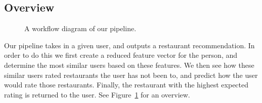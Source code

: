 \documentclass[10pt,twocolumn,letterpaper]{article}
\begin{document}
\subsection{Overview}
\begin{figure}[t]
\begin{center}
\end{center}
   \caption{A workflow diagram of our pipeline.}
\label{fig:workflow}
\end{figure}

Our pipeline takes in a given user, and outputs a restaurant recommendation. In order to do this we first create a reduced feature vector for the person, and determine the most similar users based on these features. We then see how these similar users rated restaurants the user has not been to, and predict how the user would rate those restaurants. Finally, the restaurant with the highest expected rating is returned to the user. See Figure~\ref{fig:workflow} for an overview.
\end{document}
